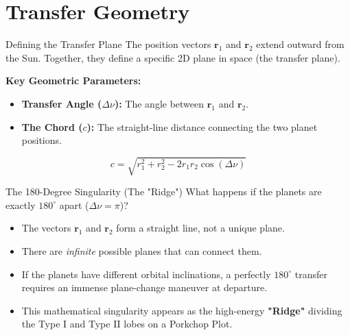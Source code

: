 \documentclass[11pt]{beamer}
\begin{document}
\section{Transfer Geometry}

\begin{frame}{Defining the Transfer Plane}
    The position vectors $\bm{r}_1$ and $\bm{r}_2$ extend outward from the Sun. Together, they define a specific 2D plane in space (the transfer plane).
    
    \vspace{0.3cm}
    \textbf{Key Geometric Parameters:}
    \begin{itemize}
        \item \textbf{Transfer Angle ($\Delta \nu$):} The angle between $\bm{r}_1$ and $\bm{r}_2$.
        \item \textbf{The Chord ($c$):} The straight-line distance connecting the two planet positions.
    \end{itemize}
    \begin{equation}
        c = \sqrt{r_1^2 + r_2^2 - 2 r_1 r_2 \cos(\Delta \nu)}
    \end{equation}
\end{frame}

\begin{frame}{The 180-Degree Singularity (The "Ridge")}
    What happens if the planets are exactly $180^\circ$ apart ($\Delta \nu = \pi$)?
    
    \vspace{0.3cm}
    \begin{itemize}
        \item The vectors $\bm{r}_1$ and $\bm{r}_2$ form a straight line, not a unique plane.
        \item There are \textit{infinite} possible planes that can connect them.
        \item If the planets have different orbital inclinations, a perfectly $180^\circ$ transfer requires an immense plane-change maneuver at departure.
        \item This mathematical singularity appears as the high-energy \textbf{"Ridge"} dividing the Type I and Type II lobes on a Porkchop Plot.
    \end{itemize}
\end{frame}

\end{document}
